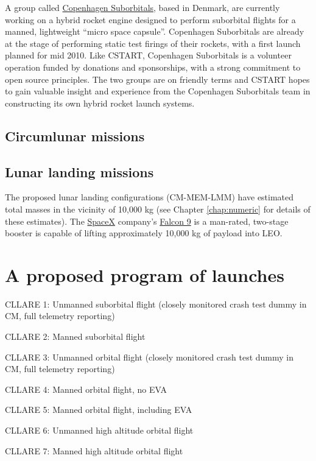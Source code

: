\documentclass{report}
\begin{document}
A group called \href{http://www.copenhagensuborbitals.com/}{Copenhagen Suborbitals}, based in Denmark, are currently working on a hybrid rocket engine designed to perform suborbital flights for a manned, lightweight ``micro space capsule''.  Copenhagen Suborbitals are already at the stage of performing static test firings of their rockets, with a first launch planned for mid 2010.  Like CSTART, Copenhagen Suborbitals is a volunteer operation funded by donations and sponsorships, with a strong commitment to open source principles.  The two groups are on friendly terms and CSTART hopes to gain valuable insight and experience from the Copenhagen Suborbitals team in constructing its own hybrid rocket launch systems.

\subsection{Circumlunar missions}

\subsection{Lunar landing missions}

The proposed lunar landing configurations (CM-MEM-LMM) have estimated total masses in the vicinity of 10,000 kg (see Chapter \ref{chap:numeric} for details of these estimates).  The \href{http://spacex.com}{SpaceX} company's \href{http://spacex.com/falcon9.php}{Falcon 9} is a man-rated, two-stage booster is capable of lifting approximately 10,000 kg of payload into LEO.

\section{A proposed program of launches}

CLLARE 1: Unmanned suborbital flight (closely monitored crash test dummy in CM, full telemetry reporting)

CLLARE 2: Manned suborbital flight

CLLARE 3: Unmanned orbital flight (closely monitored crash test dummy in CM, full telemetry reporting)

CLLARE 4: Manned orbital flight, no EVA

CLLARE 5: Manned orbital flight, including EVA

CLLARE 6: Unmanned high altitude orbital flight

CLLARE 7: Manned high altitude orbital flight
\end{document}
